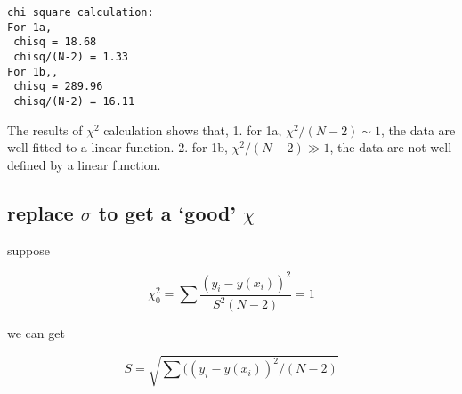 \documentclass{article}
\newlength{\cellleftmargin}
\newlength{\smallerfontscale}
\def\smaller{\fontsize{\smallerfontscale}{\smallerfontscale}\selectfont}
\begin{document}
\par\vspace{1\smallerfontscale}%
    \begin{addmargin}[\cellleftmargin]{0em}%
    {\smaller%
    \vspace{-1\smallerfontscale}%
    
    \begin{Verbatim}[commandchars=\\\{\}]
chi square calculation:
For 1a,
 chisq = 18.68
 chisq/(N-2) = 1.33
For 1b,,
 chisq = 289.96
 chisq/(N-2) = 16.11
    \end{Verbatim}
}%
    \end{addmargin}%
    The results of $\chi^2$ calculation shows that, 1. for 1a,
$\chi^2/(N-2) \sim 1$, the data are well fitted to a linear function. 2.
for 1b, $\chi^2/(N-2) \gg 1$, the data are not well defined by a linear
function.

\subsection{replace $\sigma$ to get a `good'
$\chi$}\label{replace-sigma-to-get-a-good-chi}

suppose

\begin{equation}
\chi^2_0 = \sum\frac{(y_i-y(x_i))^2}{S^2(N-2)} = 1
\end{equation}

we can get

\begin{equation}
S = \sqrt{\sum((y_i-y(x_i))^2/(N-2)}
\end{equation}

\end{document}
